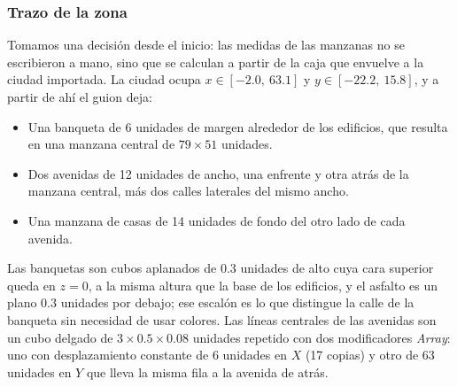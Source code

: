 \subsubsection{Trazo de la zona}
Tomamos una decisión desde el inicio: las medidas de las manzanas no se escribieron a mano, sino que se calculan a partir de la caja que envuelve a la ciudad importada. La ciudad ocupa $x \in [-2.0,\ 63.1]$ y $y \in [-22.2,\ 15.8]$, y a partir de ahí el guion deja:
\begin{itemize}
    \item Una banqueta de 6 unidades de margen alrededor de los edificios, que resulta en una manzana central de $79 \times 51$ unidades.
    \item Dos avenidas de 12 unidades de ancho, una enfrente y otra atrás de la manzana central, más dos calles laterales del mismo ancho.
    \item Una manzana de casas de 14 unidades de fondo del otro lado de cada avenida.
\end{itemize}
Las banquetas son cubos aplanados de 0.3 unidades de alto cuya cara superior queda en $z = 0$, a la misma altura que la base de los edificios, y el asfalto es un plano 0.3 unidades por debajo; ese escalón es lo que distingue la calle de la banqueta sin necesidad de usar colores. Las líneas centrales de las avenidas son un cubo delgado de $3 \times 0.5 \times 0.08$ unidades repetido con dos modificadores \textit{Array}: uno con desplazamiento constante de 6 unidades en $X$ (17 copias) y otro de 63 unidades en $Y$ que lleva la misma fila a la avenida de atrás.

